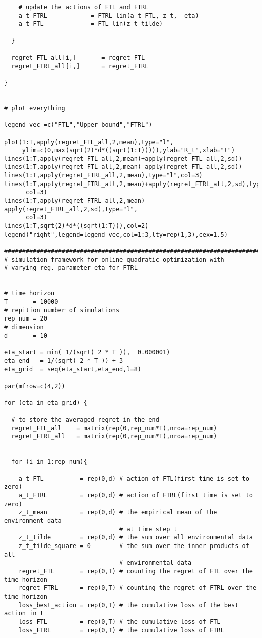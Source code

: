 \documentclass[a4paper]{article}
\begin{document}
{\begin{lstlisting}
    # update the actions of FTL and FTRL        
    a_t_FTRL            = FTRL_lin(a_t_FTL, z_t,  eta) 
    a_t_FTL             = FTL_lin(z_t_tilde) 
    
  }
  
  regret_FTL_all[i,]       = regret_FTL
  regret_FTRL_all[i,]      = regret_FTRL
  
}


# plot everything 

legend_vec =c("FTL","Upper bound","FTRL")

plot(1:T,apply(regret_FTL_all,2,mean),type="l",
     ylim=c(0,max(sqrt(2)*d*((sqrt(1:T))))),ylab="R_t",xlab="t")
lines(1:T,apply(regret_FTL_all,2,mean)+apply(regret_FTL_all,2,sd))
lines(1:T,apply(regret_FTL_all,2,mean)-apply(regret_FTL_all,2,sd))
lines(1:T,apply(regret_FTRL_all,2,mean),type="l",col=3)
lines(1:T,apply(regret_FTRL_all,2,mean)+apply(regret_FTRL_all,2,sd),type="l",
      col=3)
lines(1:T,apply(regret_FTRL_all,2,mean)-apply(regret_FTRL_all,2,sd),type="l",
      col=3)
lines(1:T,sqrt(2)*d*((sqrt(1:T))),col=2)
legend("right",legend=legend_vec,col=1:3,lty=rep(1,3),cex=1.5)

###############################################################################
# simulation framework for online quadratic optimization with 
# varying reg. parameter eta for FTRL


# time horizon
T       = 10000
# repition number of simulations
rep_num = 20
# dimension
d       = 10

eta_start = min( 1/(sqrt( 2 * T )),  0.000001)
eta_end   = 1/(sqrt( 2 * T )) + 3
eta_grid  = seq(eta_start,eta_end,l=8)

par(mfrow=c(4,2))

for (eta in eta_grid) {
  
  # to store the averaged regret in the end
  regret_FTL_all    = matrix(rep(0,rep_num*T),nrow=rep_num)
  regret_FTRL_all   = matrix(rep(0,rep_num*T),nrow=rep_num)
  
  
  for (i in 1:rep_num){ 
    
    a_t_FTL          = rep(0,d) # action of FTL(first time is set to zero)
    a_t_FTRL         = rep(0,d) # action of FTRL(first time is set to zero)
    z_t_mean         = rep(0,d) # the empirical mean of the environment data 
                                # at time step t
    z_t_tilde        = rep(0,d) # the sum over all environmental data
    z_t_tilde_square = 0        # the sum over the inner products of all 
                                # environmental data
    regret_FTL       = rep(0,T) # counting the regret of FTL over the time horizon 
    regret_FTRL      = rep(0,T) # counting the regret of FTRL over the time horizon
    loss_best_action = rep(0,T) # the cumulative loss of the best action in t
    loss_FTL         = rep(0,T) # the cumulative loss of FTL 
    loss_FTRL        = rep(0,T) # the cumulative loss of FTRL 
    

\end{lstlisting}}
\end{document}
